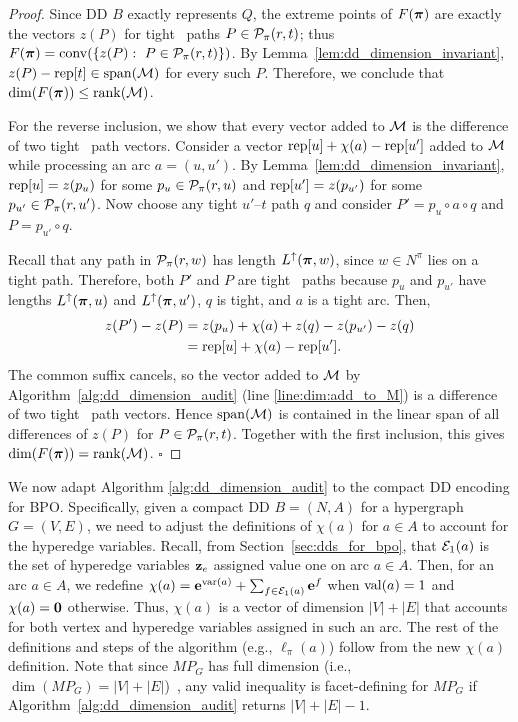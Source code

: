 \begin{proof}

Since DD $B$ exactly represents $Q$, the extreme points of $F(\bm{\pi})$ are exactly the vectors $z(P)$ for tight \rt\ paths $P \in \mathcal{P}_\pi(r,t)$; thus $F(\bm{\pi})=\operatorname{conv}(\{z(P):\ P \in \mathcal{P}_\pi(r,t) \})$. By Lemma~\ref{lem:dd_dimension_invariant}, $z(P)-\operatorname{rep}[t]\in\operatorname{span}(\mathcal{M})$ for every such $P$. Therefore, we conclude that $\dim(F(\bm{\pi})) \leq \operatorname{rank}(\mathcal{M})$.

For the reverse inclusion, we show that every vector added to $\mathcal{M}$ is the difference of two tight \rt\ path vectors. Consider a vector $\operatorname{rep}[u]+\chi(a)-\operatorname{rep}[u']$ added to $\mathcal{M}$ while processing an arc $a=(u,u')$. By Lemma~\ref{lem:dd_dimension_invariant}, $\operatorname{rep}[u]=z(p_u)$ for some $p_u\in\mathcal{P}_\pi(r,u)$ and $\operatorname{rep}[u']=z(p_{u'})$ for some $p_{u'}\in\mathcal{P}_\pi(r,u')$. Now choose any tight $u'$--$t$ path $q$ and consider $P' = p_u\circ a\circ q$ and $P = p_{u'}\circ q$. 

Recall that any path in $\mathcal{P}_\pi(r,w)$ has length $L^\uparrow(\bm{\pi},w)$, since $w\in N^\pi$ lies on a tight path. Therefore, both $P'$ and $P$ are tight \rt\ paths because $p_u$ and $p_{u'}$ have lengths $L^\uparrow(\bm{\pi},u)$ and $L^\uparrow(\bm{\pi},u')$, $q$ is tight, and $a$ is a tight arc. Then,
\[
\begin{aligned}
z(P')-z(P)
&=z(p_u)+\chi(a)+z(q)-z(p_{u'})-z(q)\\
&=\operatorname{rep}[u]+\chi(a)-\operatorname{rep}[u'].
\end{aligned}
\]
The common suffix cancels, so the vector added to $\mathcal{M}$ by Algorithm~\ref{alg:dd_dimension_audit} (line \ref{line:dim:add_to_M}) is a difference of two tight \rt\ path vectors. Hence $\operatorname{span}(\mathcal{M})$ is contained in the linear span of all differences of $z(P)$ for $P \in \mathcal{P}_\pi(r,t)$. Together with the first inclusion, this gives $\dim(F(\bm{\pi}))=\operatorname{rank}(\mathcal{M})$. \hfill $\square$
\end{proof}


We now adapt Algorithm \ref{alg:dd_dimension_audit} to the compact DD encoding for BPO. Specifically, given a compact DD $B=(N,A)$ for a hypergraph $G=(V,E)$, we need to adjust the definitions of $\chi(a)$ for $a\in A$ to account for the hyperedge variables. Recall, from 
Section~\ref{sec:dds_for_bpo}, that
$\mathcal{E}_1(a)$ is the set of hyperedge variables $\mathbf{z}_e$ assigned value one on arc $a\in A$. Then, for an arc $a\in A$, we redefine $\chi(a) = \mathbf{e}^{\operatorname{var}(a)}+\sum_{f\in\mathcal{E}_1(a)}\mathbf{e}^{f}$ when  $\operatorname{val}(a)=1$ and $\chi(a)=\mathbf{0}$ otherwise. Thus, $\chi(a)$ is a vector of dimension $|V|+|E|$ that accounts for both vertex and hyperedge variables assigned in such an arc. 
The rest of the definitions and steps of the algorithm (e.g., $\ell_\pi(a)$) follow from the new  $\chi(a)$ definition. Note that since $MP_G$ has full dimension (i.e., $\dim(MP_G)=|V|+|E|$)~\cite{del2017polyhedral}, any valid inequality is facet-defining for $MP_G$ if Algorithm~\ref{alg:dd_dimension_audit} returns $|V|+|E|-1$.

